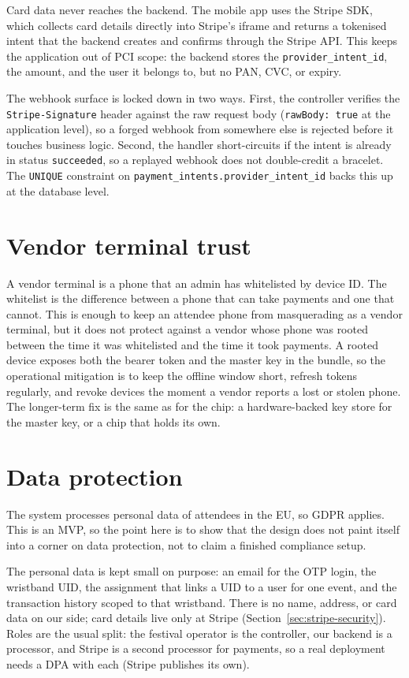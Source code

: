 Card data never reaches the backend. The mobile app uses the Stripe SDK, which collects card details directly into Stripe's iframe and returns a tokenised intent that the backend creates and confirms through the Stripe API. This keeps the application out of PCI scope: the backend stores the \texttt{provider\_intent\_id}, the amount, and the user it belongs to, but no PAN, CVC, or expiry.

The webhook surface is locked down in two ways. First, the controller verifies the \texttt{Stripe-Signature} header against the raw request body (\texttt{rawBody: true} at the application level), so a forged webhook from somewhere else is rejected before it touches business logic. Second, the handler short-circuits if the intent is already in status \texttt{succeeded}, so a replayed webhook does not double-credit a bracelet. The \texttt{UNIQUE} constraint on \texttt{payment\_intents.provider\_intent\_id} backs this up at the database level.

\section{Vendor terminal trust}
\label{sec:vendor-trust}

A vendor terminal is a phone that an admin has whitelisted by device ID. The whitelist is the difference between a phone that can take payments and one that cannot. This is enough to keep an attendee phone from masquerading as a vendor terminal, but it does not protect against a vendor whose phone was rooted between the time it was whitelisted and the time it took payments. A rooted device exposes both the bearer token and the master key in the bundle, so the operational mitigation is to keep the offline window short, refresh tokens regularly, and revoke devices the moment a vendor reports a lost or stolen phone. The longer-term fix is the same as for the chip: a hardware-backed key store for the master key, or a chip that holds its own.

\section{Data protection}
\label{sec:data-protection}

The system processes personal data of attendees in the EU, so GDPR applies. This is an MVP, so the point here is to show that the design does not paint itself into a corner on data protection, not to claim a finished compliance setup.

The personal data is kept small on purpose: an email for the OTP login, the wristband UID, the assignment that links a UID to a user for one event, and the transaction history scoped to that wristband. There is no name, address, or card data on our side; card details live only at Stripe (Section~\ref{sec:stripe-security}). Roles are the usual split: the festival operator is the controller, our backend is a processor, and Stripe is a second processor for payments, so a real deployment needs a DPA with each (Stripe publishes its own).

